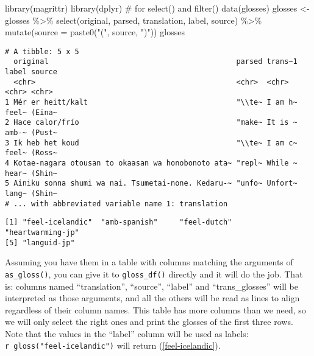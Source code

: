 \documentclass[
  letterpaper,
  DIV=11,
  numbers=noendperiod]{scrartcl}
\newenvironment{Shaded}{\begin{snugshade}}{\end{snugshade}}
\newcommand{\AttributeTok}[1]{\textcolor[rgb]{0.40,0.45,0.13}{#1}}
\newcommand{\CommentTok}[1]{\textcolor[rgb]{0.37,0.37,0.37}{#1}}
\newcommand{\FunctionTok}[1]{\textcolor[rgb]{0.28,0.35,0.67}{#1}}
\newcommand{\NormalTok}[1]{\textcolor[rgb]{0.00,0.23,0.31}{#1}}
\newcommand{\OtherTok}[1]{\textcolor[rgb]{0.00,0.23,0.31}{#1}}
\newcommand{\SpecialCharTok}[1]{\textcolor[rgb]{0.37,0.37,0.37}{#1}}
\newcommand{\StringTok}[1]{\textcolor[rgb]{0.13,0.47,0.30}{#1}}
\begin{document}
\begin{Shaded}
\begin{Highlighting}[]
\FunctionTok{library}\NormalTok{(magrittr)}
\FunctionTok{library}\NormalTok{(dplyr) }\CommentTok{\# for select() and filter()}
\FunctionTok{data}\NormalTok{(glosses)}
\NormalTok{glosses }\OtherTok{\textless{}{-}}\NormalTok{ glosses }\SpecialCharTok{\%\textgreater{}\%} 
  \FunctionTok{select}\NormalTok{(original, parsed, translation, label, source) }\SpecialCharTok{\%\textgreater{}\%} 
  \FunctionTok{mutate}\NormalTok{(}\AttributeTok{source =} \FunctionTok{paste0}\NormalTok{(}\StringTok{"("}\NormalTok{, source, }\StringTok{")"}\NormalTok{))}
\NormalTok{glosses}
\end{Highlighting}
\end{Shaded}

\begin{verbatim}
# A tibble: 5 x 5
  original                                           parsed trans~1 label source
  <chr>                                              <chr>  <chr>   <chr> <chr> 
1 Mér er heitt/kalt                                  "\\te~ I am h~ feel~ (Eina~
2 Hace calor/frío                                    "make~ It is ~ amb-~ (Pust~
3 Ik heb het koud                                    "\\te~ I am c~ feel~ (Ross~
4 Kotae-nagara otousan to okaasan wa honobonoto ata~ "repl~ While ~ hear~ (Shin~
5 Ainiku sonna shumi wa nai. Tsumetai-none. Kedaru-~ "unfo~ Unfort~ lang~ (Shin~
# ... with abbreviated variable name 1: translation
\end{verbatim}

\begin{Shaded}
\end{Shaded}

\begin{verbatim}
[1] "feel-icelandic"  "amb-spanish"     "feel-dutch"      "heartwarming-jp"
[5] "languid-jp"     
\end{verbatim}

Assuming you have them in a table with columns matching the arguments of
\texttt{as\_gloss()}, you can give it to \texttt{gloss\_df()} directly
and it will do the job. That is: columns named ``translation'',
``source'', ``label'' and ``trans\_glosses'' will be interpreted as
those arguments, and all the others will be read as lines to align
regardless of their column names. This table has more columns than we
need, so we will only select the right ones and print the glosses of the
first three rows. Note that the values in the ``label'' column will be
used as labels:
\texttt{\textasciigrave{}r\ gloss("feel-icelandic")\textasciigrave{}}
will return (\ref{feel-icelandic}).
\end{document}
